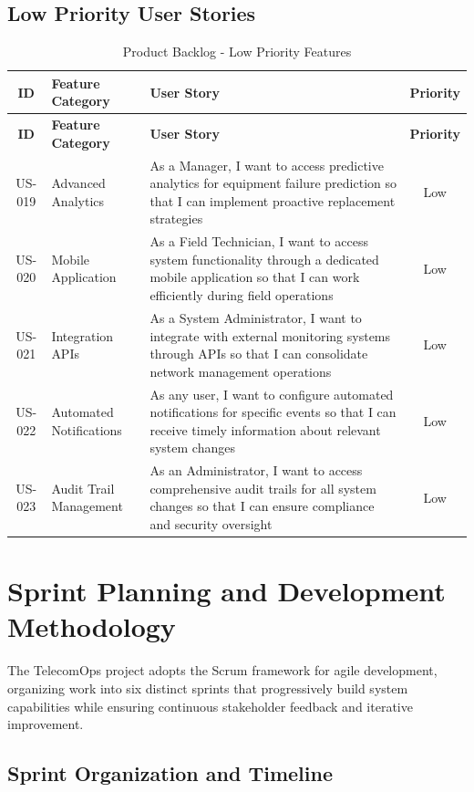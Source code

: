 \subsection{Low Priority User Stories}

\begin{longtable}{|c|p{3.5cm}|p{7.5cm}|c|}
\caption{Product Backlog - Low Priority Features} \\
\hline
\textbf{ID} & \textbf{Feature Category} & \textbf{User Story} & \textbf{Priority} \\
\hline
\endfirsthead
\hline
\textbf{ID} & \textbf{Feature Category} & \textbf{User Story} & \textbf{Priority} \\
\hline
\endhead
US-019 & Advanced Analytics & As a Manager, I want to access predictive analytics for equipment failure prediction so that I can implement proactive replacement strategies & Low \\
\hline
US-020 & Mobile Application & As a Field Technician, I want to access system functionality through a dedicated mobile application so that I can work efficiently during field operations & Low \\
\hline
US-021 & Integration APIs & As a System Administrator, I want to integrate with external monitoring systems through APIs so that I can consolidate network management operations & Low \\
\hline
US-022 & Automated Notifications & As any user, I want to configure automated notifications for specific events so that I can receive timely information about relevant system changes & Low \\
\hline
US-023 & Audit Trail Management & As an Administrator, I want to access comprehensive audit trails for all system changes so that I can ensure compliance and security oversight & Low \\
\hline
\end{longtable}

\section{Sprint Planning and Development Methodology}

The TelecomOps project adopts the Scrum framework for agile development, organizing work into six distinct sprints that progressively build system capabilities while ensuring continuous stakeholder feedback and iterative improvement.

\subsection{Sprint Organization and Timeline}

